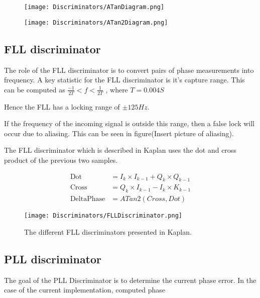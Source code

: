 \begin{figure}[!htb] 
    \centering
    \texttt{[image: Discriminators/ATanDiagram.png]} 
    \caption{}
    \label{fig:ATanDiagram}
\end{figure}

\begin{figure}[!htb] 
    \centering
    \texttt{[image: Discriminators/ATan2Diagram.png]} 
    \caption{}
    \label{fig:ATan2Diagram}
\end{figure}


\subsection{FLL discriminator}
The role of the FLL discriminator is to convert pairs of phase measurements into frequency. A key statistic for the FLL discriminator is it's capture range. This can be computed as 
$\frac{-1}{2T} < f < \frac{1}{2T}$
, where $T = 0.004S$

Hence the FLL has a locking range of $\pm 125Hz$. 

If the frequency of the incoming signal is outside this range, then a false lock will occur due to aliasing. This can be seen in figure(Insert picture of aliasing). 

The FLL discriminator which is described in Kaplan uses the dot and cross product of the previous two samples.

\begin{align*}
\text{Dot} &= I_{k}\times I_{k-1} + Q_{k}\times Q_{k-1}\\
\text{Cross} &= Q_{k} \times I_{k-1} - I_{k} \times K_{k-1}\\
\text{DeltaPhase} &= ATan2(Cross,Dot)
\end{align*}


\begin{figure}[!htb] 
    \centering
    \texttt{[image: Discriminators/FLLDiscriminator.png]} 
    \caption{The different FLL discriminators presented in Kaplan.\cite{Kaplan}}
    \label{fig:FLLDiscriminatorTable}
\end{figure}




\subsection{PLL discriminator}
The goal of the PLL Discriminator is to determine the current phase error. In the case of the current implementation, computed phase 


